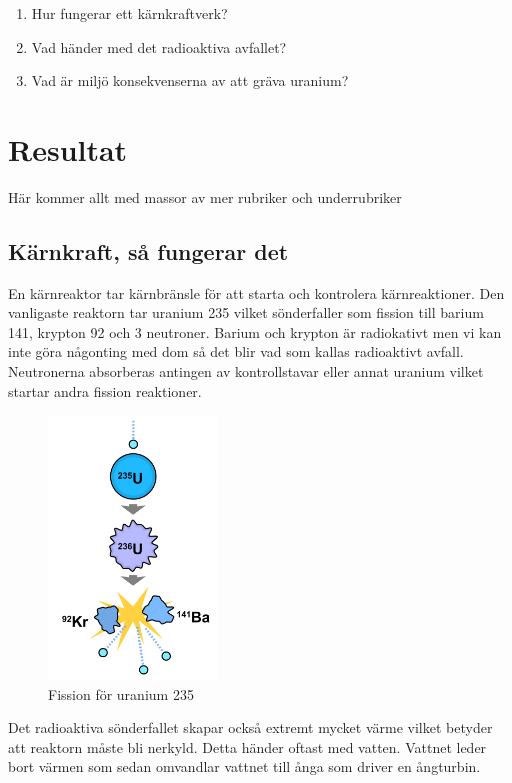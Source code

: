 \documentclass[11p]{article}
\begin{document}
    \begin{enumerate}
        \item Hur fungerar ett kärnkraftverk?
        \item Vad händer med det radioaktiva avfallet?
        \item Vad är miljö konsekvenserna av att gräva uranium?
    \end{enumerate}

    \section{Resultat}
    Här kommer allt med massor av mer rubriker och underrubriker
    \subsection{Kärnkraft, så fungerar det}
En kärnreaktor tar kärnbränsle för att starta och kontrolera kärnreaktioner.
Den vanligaste reaktorn tar uranium 235 vilket sönderfaller som fission till barium 141, krypton 92 och 3 neutroner.
Barium och krypton är radiokativt men vi kan inte göra någonting med dom så det blir vad som kallas radioaktivt avfall.
Neutronerna absorberas antingen av kontrollstavar eller annat uranium vilket startar andra fission reaktioner.
    \begin{figure}
        \includegraphics[width=0.4\textwidth]{../images/fission.png}
        \caption{Fission för uranium 235\parencite{figur1}}
        \label{fig:fission}
    \end{figure}

Det radioaktiva sönderfallet skapar också extremt mycket värme vilket betyder att reaktorn måste bli nerkyld.
Detta händer oftast med vatten.
Vattnet leder bort värmen som sedan omvandlar vattnet till ånga som driver en ångturbin.
\parencite{Nuclear_reactor}
\end{document}
